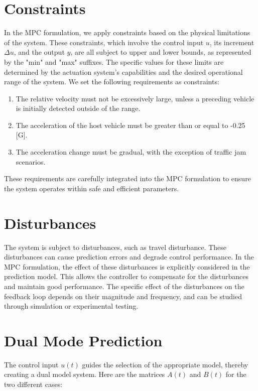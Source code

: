 \documentclass[12pt]{report}
\begin{document}
\section{Constraints}
In the MPC formulation, we apply constraints based on the physical limitations of the system. These constraints, which involve the control input \(u\), its increment \(\Delta u\), and the output \(y\), are all subject to upper and lower bounds, as represented by the "min" and "max" suffixes. The specific values for these limits are determined by the actuation system's capabilities and the desired operational range of the system. We set the following requirements as constraints:

\begin{enumerate}
    \item The relative velocity must not be excessively large, unless a preceding vehicle is initially detected outside of the range.
    \item The acceleration of the host vehicle must be greater than or equal to -0.25 [G].
    \item The acceleration change must be gradual, with the exception of traffic jam scenarios.
\end{enumerate}

These requirements are carefully integrated into the MPC formulation to ensure the system operates within safe and efficient parameters.


\section{Disturbances}
The system is subject to disturbances, such as travel disturbance. These disturbances can cause prediction errors and degrade control performance. In the MPC formulation, the effect of these disturbances is explicitly considered in the prediction model. This allows the controller to compensate for the disturbances and maintain good performance. The specific effect of the disturbances on the feedback loop depends on their magnitude and frequency, and can be studied through simulation or experimental testing.

\section{Dual Mode Prediction}
The control input \(u(t)\) guides the selection of the appropriate model, thereby creating a dual model system. Here are the matrices \(A(t)\) and \(B(t)\) for the two different cases:
\end{document}
